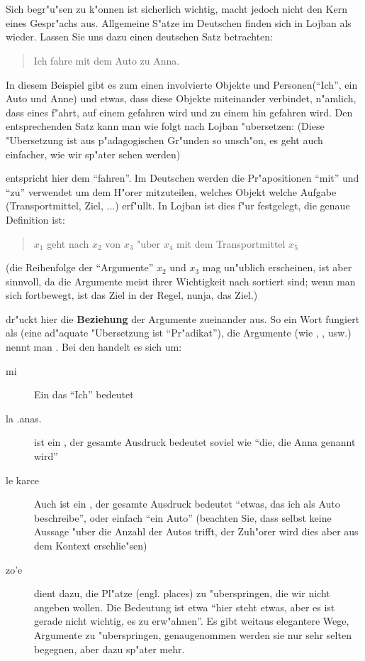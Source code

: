 \chapter{}
Sich begr"u"sen zu k"onnen ist sicherlich wichtig, macht jedoch nicht den Kern eines Gespr"achs aus. Allgemeine S"atze im Deutschen finden sich in Lojban als  wieder.
Lassen Sie uns dazu einen deutschen Satz betrachten:
\begin{quote}
Ich fahre mit dem Auto zu Anna.
\end{quote}
In diesem Beispiel gibt es zum einen involvierte Objekte und Personen(``Ich'',
ein Auto und Anne) und etwas, dass diese Objekte miteinander verbindet, n"amlich, dass
eines f"ahrt, auf einem gefahren wird und zu einem hin gefahren wird.
Den entsprechenden Satz kann man wie folgt nach Lojban "ubersetzen: (Diese "Ubersetzung ist aus p"adagogischen Gr"unden so unsch"on, es geht auch einfacher, wie wir sp"ater sehen werden)
\begin{quote}
\end{quote}
 entspricht hier dem ``fahren''. Im Deutschen werden die Pr"apositionen ``mit'' und ``zu'' verwendet um dem H"orer mitzuteilen, welches Objekt welche Aufgabe (Transportmittel, Ziel, ...) erf"ullt.
In Lojban ist dies f"ur  festgelegt, die genaue Definition ist:
\begin{quote}
$x_1$ geht nach $x_2$ von $x_3$ "uber $x_4$ mit dem Transportmittel $x_5$
\end{quote}
(die Reihenfolge der ``Argumente'' $x_2$ und $x_3$ mag un"ublich erscheinen, ist aber sinnvoll, da die Argumente meist ihrer Wichtigkeit nach sortiert sind; wenn man 
sich fortbewegt, ist das Ziel in der Regel, nunja, das Ziel.)

 dr"uckt hier die \textbf{Beziehung} der Argumente zueinander aus. So ein Wort fungiert als  (eine ad"aquate "Ubersetzung ist ``Pr"adikat''), die Argumente
(wie , , usw.) nennt man .
Bei den  handelt es sich um:
\begin{description}
\item[mi] Ein  das ``Ich'' bedeutet
\item[la .anas.]  ist ein , der gesamte Ausdruck bedeutet soviel wie ``die, die Anna genannt wird''
\item[le karce] Auch  ist ein , der gesamte Ausdruck bedeutet ``etwas, das ich als Auto beschreibe'', oder einfach ``ein Auto''
(beachten Sie, dass  selbst keine Aussage "uber die Anzahl der Autos trifft, der Zuh"orer wird dies aber aus dem Kontext erschlie"sen)
\item[zo'e]  dient dazu, die Pl"atze (engl. places) zu "uberspringen, die wir nicht angeben wollen. Die Bedeutung ist etwa ``hier steht etwas, aber es ist
gerade nicht wichtig, es zu erw"ahnen''. Es gibt weitaus elegantere Wege, Argumente zu "uberspringen, genaugenommen werden sie  nur sehr selten begegnen, aber dazu
sp"ater mehr.
\end{description}

